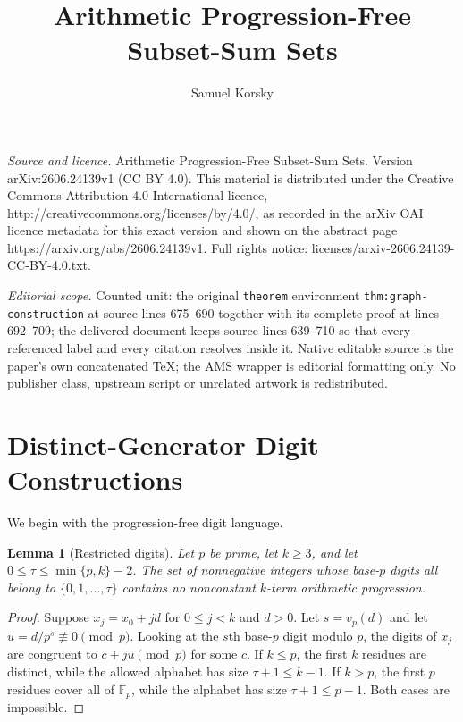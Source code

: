 \documentclass[10pt,a4paper]{amsart}
\numberwithin{equation}{section}
\newtheorem{lemma}[theorem]{Lemma}
\newcommand{\F}{\mathbb{F}}
\begin{document}
\title[Arithmetic Progression-Free Subset-Sum Sets]{Arithmetic Progression-Free Subset-Sum Sets}
\author{Samuel Korsky}
\date{}
\maketitle
\noindent\emph{Source and licence.} Arithmetic Progression-Free Subset-Sum Sets. Version arXiv:2606.24139v1 (CC BY 4.0). This material is distributed under the Creative Commons Attribution 4.0 International licence, http://creativecommons.org/licenses/by/4.0/, as recorded in the arXiv OAI licence metadata for this exact version and shown on the abstract page https://arxiv.org/abs/2606.24139v1. Full rights notice: licenses/arxiv-2606.24139-CC-BY-4.0.txt.\par\smallskip
\noindent\textit{Editorial scope.} Counted unit: the original \texttt{theorem} environment \texttt{thm:graph-construction} at source lines 675--690 together with its complete proof at lines 692--709; the delivered document keeps source lines 639--710 so that every referenced label and every citation resolves inside it. Native editable source is the paper's own concatenated TeX; the AMS wrapper is editorial formatting only. No publisher class, upstream script or unrelated artwork is redistributed.
\section{Distinct-Generator Digit Constructions}\label{sec:upper}

We begin with the progression-free digit language.

\begin{lemma}[Restricted digits]\label{lem:restricted-digits}
Let $p$ be prime, let $k\ge3$, and let $0\le\tau\le\min\{p,k\}-2$. The set of nonnegative integers whose base-$p$ digits all belong to $\{0,1,\ldots,\tau\}$ contains no nonconstant $k$-term arithmetic progression.
\end{lemma}

\begin{proof}
Suppose $x_j=x_0+jd$ for $0\le j<k$ and $d>0$. Let $s=v_p(d)$ and let $u=d/p^s\not\equiv0\pmod p$. Looking at the $s$th base-$p$ digit modulo $p$, the digits of $x_j$ are congruent to $c+ju\pmod p$ for some $c$. If $k\le p$, the first $k$ residues are distinct, while the allowed alphabet has size $\tau+1\le k-1$. If $k>p$, the first $p$ residues cover all of $\F_p$, while the alphabet has size $\tau+1\le p-1$. Both cases are impossible.
\end{proof}
\end{document}
